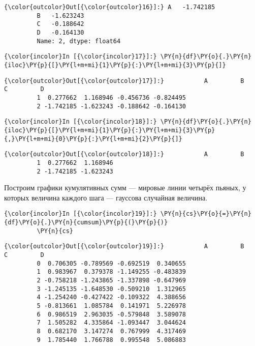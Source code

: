             \begin{Verbatim}[commandchars=\\\{\}]
{\color{outcolor}Out[{\color{outcolor}16}]:} A   -1.742185
         B   -1.623243
         C   -0.188642
         D   -0.164130
         Name: 2, dtype: float64
\end{Verbatim}
        
    \begin{Verbatim}[commandchars=\\\{\}]
{\color{incolor}In [{\color{incolor}17}]:} \PY{n}{df}\PY{o}{.}\PY{n}{iloc}\PY{p}{[}\PY{l+m+mi}{1}\PY{p}{:}\PY{l+m+mi}{3}\PY{p}{]}
\end{Verbatim}

            \begin{Verbatim}[commandchars=\\\{\}]
{\color{outcolor}Out[{\color{outcolor}17}]:}           A         B         C         D
         1  0.277662  1.168946 -0.456736 -0.824495
         2 -1.742185 -1.623243 -0.188642 -0.164130
\end{Verbatim}
        
    \begin{Verbatim}[commandchars=\\\{\}]
{\color{incolor}In [{\color{incolor}18}]:} \PY{n}{df}\PY{o}{.}\PY{n}{iloc}\PY{p}{[}\PY{l+m+mi}{1}\PY{p}{:}\PY{l+m+mi}{3}\PY{p}{,}\PY{l+m+mi}{0}\PY{p}{:}\PY{l+m+mi}{2}\PY{p}{]}
\end{Verbatim}

            \begin{Verbatim}[commandchars=\\\{\}]
{\color{outcolor}Out[{\color{outcolor}18}]:}           A         B
         1  0.277662  1.168946
         2 -1.742185 -1.623243
\end{Verbatim}
        
    Построим графики кумулятивных сумм --- мировые линии четырёх пьяных, у
которых величина каждого шага --- гауссова случайная величина.

    \begin{Verbatim}[commandchars=\\\{\}]
{\color{incolor}In [{\color{incolor}19}]:} \PY{n}{cs}\PY{o}{=}\PY{n}{df}\PY{o}{.}\PY{n}{cumsum}\PY{p}{(}\PY{p}{)}
         \PY{n}{cs}
\end{Verbatim}

            \begin{Verbatim}[commandchars=\\\{\}]
{\color{outcolor}Out[{\color{outcolor}19}]:}           A         B         C         D
         0  0.706305 -0.789569 -0.692519  0.340655
         1  0.983967  0.379378 -1.149255 -0.483839
         2 -0.758218 -1.243865 -1.337898 -0.647969
         3 -1.245135 -1.648530 -0.509210  1.312965
         4 -1.254240 -0.427422 -0.109322  4.388656
         5 -0.813661  1.085784  0.141971  5.226978
         6  0.986519  2.963035 -0.579848  3.589078
         7  1.505282  4.335864 -1.093447  3.044624
         8  0.682170  3.147274  0.767999  4.317469
         9  1.785440  1.766788  0.995548  5.086883
\end{Verbatim}
        
